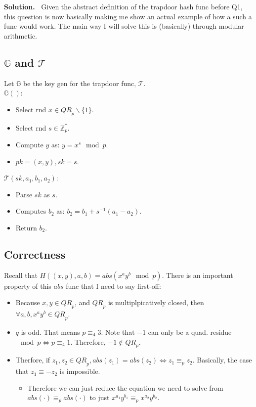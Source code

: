 \documentclass[12pt]{article}
\theoremstyle{definition}
\newcommand{\addbigskip}{\addvspace{\bigskipamount}}
\newenvironment{solution}
     {\addbigskip
      \noindent\color{blue}\textbf{Solution.\ }}
     {\par\addbigskip}
\newenvironment{solution}
     {\comment}
     {\endcomment}
\newcommand{\pk}{\mathit{pk}}
\newcommand{\sk}{\mathit{sk}}
\newcommand{\qrp}{\mathit{QR}_p}
\newcommand{\Z}{\mathbb{Z}}
\newcommand{\G}{\mathbb{G}}
\newcommand{\T}{\mathcal{T}}
\begin{document}
\begin{solution}
Given the abstract definition of the trapdoor hash func before Q1, this question is now basically making me show an actual example of how a such a func would work.
The main way I will solve this is (basically) through modular arithmetic.

\subsection*{$\G$ and $\T$}
Let $\G$ be the key gen for the trapdoor func, $\T$.\\

\noindent $\G()$:
\begin{itemize}
    \item Select rnd $x \in \qrp \backslash \{1\}$.
    \item Select rnd $s \in \Z_p^*$.
    \item Compute $y$ as: $y = x^s \mod p$.
    \item $\pk = (x, y), \sk = s$.
\end{itemize}

\noindent $\T(\sk, a_1, b_1, a_2)$:
\begin{itemize}
    \item Parse $\sk$ as $s$.
    \item Computes $b_2$ as: $b_2 = b_1 + s^{-1}(a_1 - a_2)$.
    \item Return $b_2$.
\end{itemize}

\subsection*{Correctness}
Recall that $H((x, y), a, b) = abs(x^a y^b \mod p)$. There is an important property of this $abs$ func that I need to say first-off:
\begin{itemize}
    \item Because $x, y \in \qrp$, and $\qrp$ is multiplpicatively closed, then $\forall a, b, x^a y^b \in \qrp$.
    \item $q$ is odd. That means $p \equiv_4 3$. Note that $-1$ can only be a quad. residue $\mod p \iff p \equiv_4 1$. Therefore, $-1 \notin \qrp$.
    \item Therfore, if $z_1, z_2 \in \qrp, abs(z_1) = abs(z_2) \iff z_1 \equiv_p z_2$. Basically, the case that $z_1 \equiv -z_2$ is impossible.
    \begin{itemize}
        \item Therefore we can just reduce the equation we need to solve from $abs(\cdot) \equiv_p abs(\cdot)$ to just $x^{a_1}y^{b_1} \equiv_p x^{a_2}y^{b_2}$.
    \end{itemize}
\end{itemize}


\end{solution}
\end{document}
